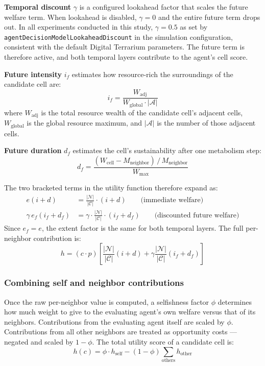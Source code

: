 \documentclass{icsthesis}
\begin{document}
\begin{mainmatter}
\textbf{Temporal discount} $\gamma$ is a configured lookahead factor that scales the future welfare term. When lookahead is disabled, $\gamma = 0$ and the entire future term drops out. In all experiments conducted in this study, $\gamma = 0.5$ as set by \texttt{agentDecisionModelLookaheadDiscount} in the simulation configuration, consistent with the default Digital Terrarium parameters. The future term is therefore active, and both temporal layers contribute to the agent's cell score.

\textbf{Future intensity} $i_f$ estimates how resource-rich the surroundings of the candidate cell are:
\[
i_f = \frac{W_{\mathrm{adj}}}{W_{\mathrm{global}} \cdot |\mathcal{A}|}
\]
where $W_{\mathrm{adj}}$ is the total resource wealth of the candidate cell’s adjacent cells, $W_{\mathrm{global}}$ is the global resource maximum, and $|\mathcal{A}|$ is the number of those adjacent cells.

\textbf{Future duration} $d_f$ estimates the cell’s sustainability after one metabolism step:
\[
d_f = \frac{(W_{\mathrm{cell}} - M_{\mathrm{neighbor}})\,/\,M_{\mathrm{neighbor}}}{W_{\mathrm{max}}}
\]

The two bracketed terms in the utility function therefore expand as:
\begin{align*}
e(i+d) &= \frac{|\mathcal{N}|}{|\mathcal{C}|} \cdot (i + d) \qquad \text{(immediate welfare)} \\[4pt]
\gamma\, e_f(i_f+d_f) &= \gamma \cdot \frac{|\mathcal{N}|}{|\mathcal{C}|} \cdot (i_f + d_f) \qquad \text{(discounted future welfare)}
\end{align*}
Since $e_f = e$, the extent factor is the same for both temporal layers. The full per-neighbor contribution is:
\[
h = (c \cdot p)\!\left[\frac{|\mathcal{N}|}{|\mathcal{C}|}(i+d) + \gamma\frac{|\mathcal{N}|}{|\mathcal{C}|}(i_f+d_f)\right]
\]

\subsubsection*{Combining self and neighbor contributions}

Once the raw per-neighbor value is computed, a selfishness factor $\phi$ determines how much weight to give to the evaluating agent’s own welfare versus that of its neighbors. Contributions from the evaluating agent itself are scaled by $\phi$. Contributions from all other neighbors are treated as opportunity costs --- negated and scaled by $1 - \phi$. The total utility score of a candidate cell is:
\[
h(c) = \phi \cdot h_{\mathrm{self}} - (1-\phi)\sum_{\mathrm{others}} h_{\mathrm{other}}
\]


\end{mainmatter}
\end{document}
